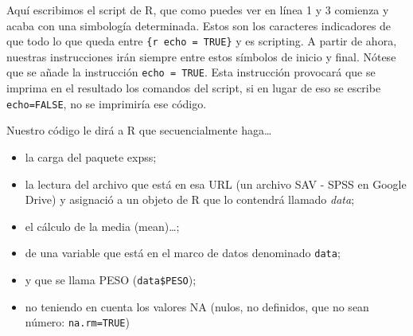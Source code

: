 \documentclass[
]{book}
\newenvironment{Shaded}{\begin{snugshade}}{\end{snugshade}}
\newcommand{\AttributeTok}[1]{\textcolor[rgb]{0.77,0.63,0.00}{#1}}
\newcommand{\CommentTok}[1]{\textcolor[rgb]{0.56,0.35,0.01}{\textit{#1}}}
\newcommand{\ConstantTok}[1]{\textcolor[rgb]{0.00,0.00,0.00}{#1}}
\newcommand{\FunctionTok}[1]{\textcolor[rgb]{0.00,0.00,0.00}{#1}}
\newcommand{\NormalTok}[1]{#1}
\newcommand{\OtherTok}[1]{\textcolor[rgb]{0.56,0.35,0.01}{#1}}
\newcommand{\SpecialCharTok}[1]{\textcolor[rgb]{0.00,0.00,0.00}{#1}}
\newcommand{\StringTok}[1]{\textcolor[rgb]{0.31,0.60,0.02}{#1}}
\providecommand{\tightlist}{%
  \setlength{\itemsep}{0pt}\setlength{\parskip}{0pt}}
\begin{document}
Aquí escribimos el script de R, que como puedes ver en línea 1 y 3 comienza y acaba con una simbología determinada. Estos son los caracteres indicadores de que todo lo que queda entre \texttt{\textasciigrave{}\textasciigrave{}\textasciigrave{}\{r\ echo\ =\ TRUE\}} y \texttt{\textasciigrave{}\textasciigrave{}\textasciigrave{}} es scripting. A partir de ahora, nuestras instrucciones irán siempre entre estos símbolos de inicio y final. Nótese que se añade la instrucción \texttt{echo\ =\ TRUE}. Esta instrucción provocará que se imprima en el resultado los comandos del script, si en lugar de eso se escribe \texttt{echo=FALSE}, no se imprimiría ese código.

Nuestro código le dirá a R que secuencialmente haga\ldots{}

\begin{itemize}
\tightlist
\item
  la carga del paquete expss;
\item
  la lectura del archivo que está en esa URL (un archivo SAV - SPSS en Google Drive) y asignació a un objeto de R que lo contendrá llamado \emph{data};
\item
  el cálculo de la media (mean)\ldots;
\item
  de una variable que está en el marco de datos denominado \texttt{data};
\item
  y que se llama PESO (\texttt{data\$PESO});
\item
  no teniendo en cuenta los valores NA (nulos, no definidos, que no sean número: \texttt{na.rm=TRUE})
\end{itemize}

\begin{Shaded}
\end{Shaded}
\end{document}
